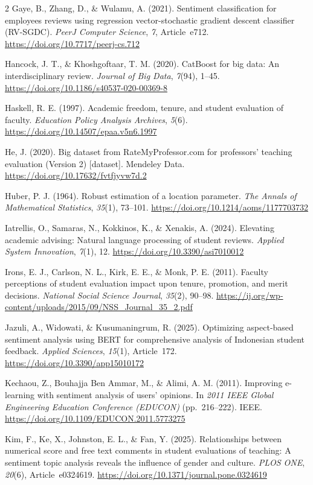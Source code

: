 \documentclass{article}
\begin{document}
\begin{multicols*}{2}
Gaye, B., Zhang, D., \& Wulamu, A. (2021). Sentiment classification for employees reviews using regression vector-stochastic gradient descent classifier (RV-SGDC). \textit{PeerJ Computer Science}, \textit{7}, Article~e712. \url{https://doi.org/10.7717/peerj-cs.712}

Hancock, J. T., \& Khoshgoftaar, T. M. (2020). CatBoost for big data: An interdisciplinary review. \textit{Journal of Big Data}, \textit{7}(94), 1--45. \url{https://doi.org/10.1186/s40537-020-00369-8}

Haskell, R. E. (1997). Academic freedom, tenure, and student evaluation of faculty. \textit{Education Policy Analysis Archives}, \textit{5}(6). \url{https://doi.org/10.14507/epaa.v5n6.1997}

He, J. (2020). Big dataset from RateMyProfessor.com for professors' teaching evaluation (Version 2) [dataset]. Mendeley Data. \url{https://doi.org/10.17632/fvtfjyvw7d.2}

Huber, P. J. (1964). Robust estimation of a location parameter. \textit{The Annals of Mathematical Statistics}, \textit{35}(1), 73--101. \url{https://doi.org/10.1214/aoms/1177703732}

Iatrellis, O., Samaras, N., Kokkinos, K., \& Xenakis, A. (2024). Elevating academic advising: Natural language processing of student reviews. \textit{Applied System Innovation}, \textit{7}(1), 12. \url{https://doi.org/10.3390/asi7010012}

Irons, E. J., Carlson, N. L., Kirk, E. E., \& Monk, P. E. (2011). Faculty perceptions of student evaluation impact upon tenure, promotion, and merit decisions. \textit{National Social Science Journal}, \textit{35}(2), 90--98. \url{https://ij.org/wp-content/uploads/2015/09/NSS_Journal_35_2.pdf} 

Jazuli, A., Widowati, \& Kusumaningrum, R. (2025). Optimizing aspect-based sentiment analysis using BERT for comprehensive analysis of Indonesian student feedback. \textit{Applied Sciences}, \textit{15}(1), Article~172. \url{https://doi.org/10.3390/app15010172}

Kechaou, Z., Bouhajja Ben Ammar, M., \& Alimi, A. M. (2011). Improving e-learning with sentiment analysis of users' opinions. In \textit{2011 IEEE Global Engineering Education Conference (EDUCON)} (pp.~216--222). IEEE. \url{https://doi.org/10.1109/EDUCON.2011.5773275}

Kim, F., Ke, X., Johnston, E. L., \& Fan, Y. (2025). Relationships between numerical score and free text comments in student evaluations of teaching: A sentiment topic analysis reveals the influence of gender and culture. \textit{PLOS ONE}, \textit{20}(6), Article~e0324619. \url{https://doi.org/10.1371/journal.pone.0324619}


\end{multicols*}
\end{document}
